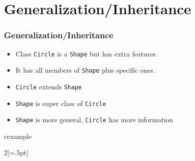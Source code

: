 \section{Generalization/Inheritance}
\begin{frame}
\frametitle{Generalization/Inheritance}
\begin{itemize}
\item Class \lstinline!Circle! \alert{is a} \lstinline!Shape! but
	has extra features.
\item It has all members of \lstinline!Shape! plus specific
	ones.
\item \lstinline!Circle! extends \lstinline!Shape!
\item \lstinline!Shape! is super class of \lstinline!Circle!
\item \lstinline!Shape! is more general, \lstinline!Circle! has
	more information
\end{itemize}
\noindent
\begin{beamercolorbox}{cexample}
\begin{multicols}{2}[\columnseprule=.5pt]
\codeInher
\end{multicols}
\end{beamercolorbox}
\end{frame}

